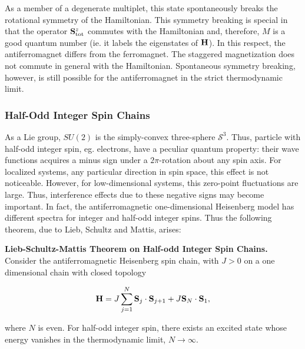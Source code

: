 \documentclass{homework}
\begin{document}
As a member of a degenerate multiplet, this state spontaneously breaks the rotational symmetry of the Hamiltonian. This symmetry breaking is special in that the operator ${\bf S}_{\textnormal{tot}}^z$ commutes with the Hamiltonian and, therefore, $M$ is a good quantum number (ie. it labels the eigenstates of ${\bf H}$). In this respect, the antiferromagnet differs from the ferromagnet. The staggered magnetization does not commute in general with the Hamiltonian. Spontaneous symmetry breaking, however, is still possible for the antiferromagnet in the strict thermodynamic limit. \\

\subsubsection{Half-Odd Integer Spin Chains}

As a Lie group, $SU(2)$ is the simply-convex three-sphere $\bm{\mathcal{S}}^3$. Thus, particle with half-odd integer spin, eg. electrons, have a peculiar quantum property: their wave functions acquires a minus sign under a $2\pi$-rotation about any spin axis. For localized systems, any particular direction in spin space, this effect is not noticeable. However, for low-dimensional systems, this zero-point fluctuations are large. Thus, interference effects due to these negative signs may become important. In fact, the antiferromagnetic one-dimensional Heisenberg model has different spectra for integer and half-odd integer spins. Thus the following theorem, due to Lieb, Schultz and Mattis, arises:


\begin{theo} \textbf{\textnormal{Lieb-Schultz-Mattis Theorem on Half-odd Integer Spin Chains.}} 
Consider the antiferromagnetic Heisenberg spin chain, with $J > 0$ on a one dimensional chain with closed topology 

\begin{equation}
    {\bf H} = J \sum_{j=1}^N {\bf S}_j \cdot {\bf S}_{j+1} + J {\bf S}_N \cdot {\bf S}_1,
\end{equation}

where $N$ is even. For half-odd integer spin, there exists an excited state whose energy vanishes in the thermodynamic limit, $N \rightarrow \infty$.
\end{theo}
\end{document}

